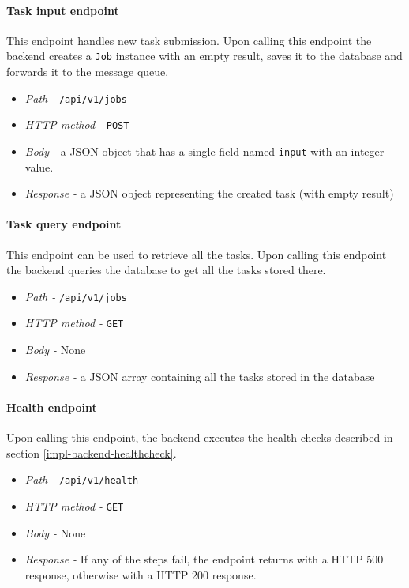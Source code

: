 \paragraph{Task input endpoint} This endpoint handles new task submission. Upon calling this endpoint the backend creates a \texttt{Job} instance with an empty result, saves it to the database and forwards it to the message queue.
\begin{itemize}
	\item \emph{Path - } \texttt{/api/v1/jobs}
	\item \emph{HTTP method - } \texttt{POST}
	\item \emph{Body - } a JSON object that has a single field named \texttt{input} with an integer value.
	\item \emph{Response - } a JSON object representing the created task (with empty result)
\end{itemize}

\paragraph{Task query endpoint} This endpoint can be used to retrieve all the tasks. Upon calling this endpoint the backend queries the database to get all the tasks stored there.
\begin{itemize}
	\item \emph{Path - } \texttt{/api/v1/jobs}
	\item \emph{HTTP method - } \texttt{GET}
	\item \emph{Body - } None
	\item \emph{Response - } a JSON array containing all the tasks stored in the database
\end{itemize}

\paragraph{Health endpoint} Upon calling this endpoint, the backend executes the health checks described in section \ref{impl-backend-healthcheck}.
\begin{itemize}
	\item \emph{Path - } \texttt{/api/v1/health}
	\item \emph{HTTP method - } \texttt{GET}
	\item \emph{Body - } None
	\item \emph{Response - } If any of the steps fail, the endpoint returns with a HTTP 500 response, otherwise with a HTTP 200 response.
\end{itemize}

